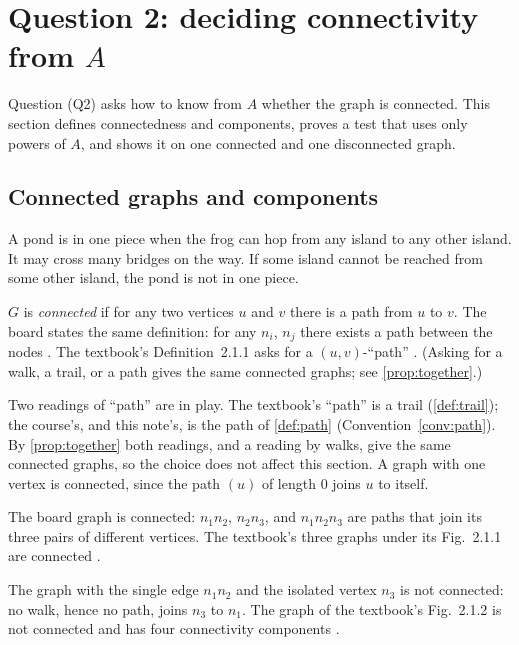 \section{Question 2: deciding connectivity from \texorpdfstring{$A$}{A}}\label{sec:connectivity}

Question (Q2) asks how to know from $A$ whether the graph is connected.
This section defines connectedness and components, proves a test that uses
only powers of $A$, and shows it on one connected and one disconnected
graph.

\subsection{Connected graphs and components}

\plainwords{} A pond is in one piece when the frog can hop from any island to
any other island. It may cross many bridges on the way. If some island
cannot be reached from some other island, the pond is not in one piece.

\begin{definition}\label{def:connected}
$G$ is \emph{connected} if for any two vertices $u$ and $v$ there is a
path from $u$ to $v$. The board states the same definition: for any $n_i$,
$n_j$ there exists a path between the nodes \cite{whiteboard1,whiteboard2}.
The textbook's Definition~2.1.1 asks for a $(u,v)$-``path''
\cite[Definition~2.1.1, p.~48]{petrosyan2015graphs}. (Asking for a walk, a
trail, or a path gives the same connected graphs; see
\cref{prop:together}.)
\end{definition}

\begin{remark}
Two readings of ``path'' are in play. The textbook's ``path'' is a trail
(\cref{def:trail}); the course's, and this note's, is the path of
\cref{def:path} (Convention~\ref{conv:path}). By \cref{prop:together}
both readings, and a reading by walks, give the same connected graphs, so
the choice does not affect this section. A graph with one vertex is
connected, since the path $(u)$ of length $0$ joins $u$ to itself.
\end{remark}
\begin{example}
The board graph is connected: $n_1n_2$, $n_2n_3$, and $n_1n_2n_3$ are paths
that join its three pairs of different vertices. The textbook's three graphs
under its Fig.~2.1.1 are connected
\cite[p.~48]{petrosyan2015graphs}.
\end{example}
\begin{nonexample}
The graph with the single edge $n_1n_2$ and the isolated vertex $n_3$ is
not connected: no walk, hence no path, joins $n_3$ to $n_1$. The graph of
the textbook's Fig.~2.1.2 is not connected and has four connectivity
components \cite[p.~49]{petrosyan2015graphs}.
\end{nonexample}

